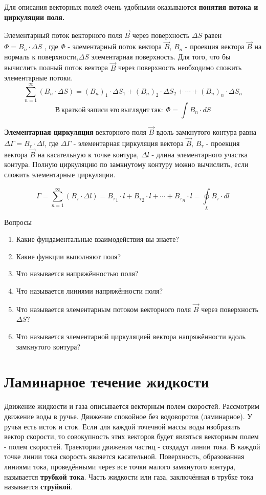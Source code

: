 \documentclass[a5paper, 10pt]{diss_4}
\renewcommand{\'}{\,'}
\begin{document}
  Для описания векторных полей очень удобными оказываются \textbf{понятия
потока и циркуляции поля.}

  Элементарный поток векторного поля $\vec{B}$ через поверхность $\Delta S$
равен $\Phi=B_n\cdot\Delta S$ , где $\Phi$ - элементарный поток вектора
$\vec{B}$, ${B}_n$ - проекция вектора $\vec{B}$ на нормаль к
поверхности,$\Delta S$ элементарная поверхность. Для того, что бы вычислить
полный поток вектора $\vec{B}$ через поверхность необходимо сложить
элементарные потоки.
\[
\sum\limits_{n=1}^{\infty}(B_n\cdot\Delta S)=
(B_n)_1\cdot\Delta S_1+(B_n)_2\cdot\Delta S_2+\cdots+(B_n)_n\cdot\Delta S_n
\]
\[
В\ краткой\ записи\ это\ выглядит\ так:\
\Phi=\int B_n\cdot dS
\]

  \textbf{Элементарная циркуляция} векторного поля $\vec{B}$ вдоль замкнутого
контура равна $\Delta\Gamma=B_\tau\cdot\Delta l$, где $\Delta\Gamma$ -
элементарная циркуляция вектора $\vec{B}$, $B_\tau$ - проекция вектора
$\vec{B}$ на касательную к точке контура, $\Delta l$ - длина элементарного
участка контура. Полную циркуляцию по замкнутому контуру можно вычислить, если
сложить элементарные циркуляции.

\[
\Gamma=\sum\limits_{n=1}^{\infty}(B_\tau\cdot\Delta l)=
{B_\tau}_1\cdot l+{B_\tau}_2\cdot l+\cdots+{B_\tau}_{n}\cdot l=
\oint\limits_{L}^{}B_\tau\cdot dl
\]

\begin{center}
   Вопросы
\end{center}
\begin{enumerate}
\item Какие фундаментальные взаимодействия вы знаете?
\item Какие функции выполняют поля?
\item Что называется напряжённостью поля?
\item Что называется линиями напряжённости поля?
\item Что называется элементарным потоком векторного поля $\vec{B}$
через поверхность $\Delta S$?
\item Что называется элементарной циркуляцией вектора напряжённости
вдоль замкнутого контура?
\end{enumerate}


\section{Ламинарное течение жидкости}

  Движение жидкости и газа описывается векторным полем скоростей. Рассмотрим
движение воды в ручье. Движение спокойное без водоворотов (ламинарное). У
ручья есть исток и сток. Если для каждой точечной массы воды изобразить
вектор скорости, то совокупность этих векторов будет являться векторным полем
- полем скоростей. Траектории движения частиц - создадут линии тока. В каждой
точке линии тока скорость является касательной. Поверхность, образованная
линиями тока, проведёнными через все точки малого замкнутого контура,
называется \textbf{трубкой тока}. Часть жидкости или газа, заключённая в трубке
 тока называется \textbf{струйкой}.
\end{document}
